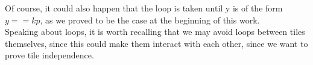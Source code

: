 \documentclass[12pt, a4paper]{article}
\begin{document}
\noindent
Of course, it could also happen that the loop is taken until y is of the form $y == kp$, as we proved to be the case at the beginning of this work.\\

\noindent
Speaking about loops, it is worth recalling that we may avoid loops between tiles themselves, since this could make them interact with each other, since we want to prove tile independence.
\end{document}
